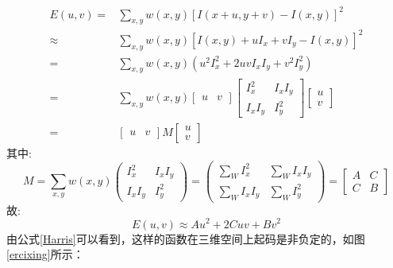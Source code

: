\begin{equation}
\begin{aligned}
E(u,v)=&\sum_{x,y} w(x,y) [I(x+u, y+v)-I(x, y)]^{2} \\
\approx&\sum_{x,y}w(x,y)\left[I(x, y)+u I_{x}+v I_{y}-I(x, y)\right]^{2}\\
=&\sum_{x,y}w(x,y) \left(u^{2} I_{x}^{2}+2 u v I_{x} I_{y}+v^{2} I_{y}^{2} \right)\\
=&\sum_{x,y}w(x,y) \left[ \begin{array}{cc}{u} & {v}\end{array}\right] \left[ \begin{array}{cc}{I_{x}^{2}} & {I_{x} I_{y}} \\ 
{I_{x} I_{y}} & {I_{y}^{2}}\end{array}\right] \left[ \begin{array}{c}{u} \\ 
{v}\end{array}\right]\\
=&\left[ \begin{array}{cc}{u} & {v}\end{array}\right]M\left[\begin{array}{c}{u}\\{v}\end{array}\right]
\end{aligned}
\end{equation}
其中:
\begin{equation}
M=\sum_{x, y} w(x, y) \left( \begin{array}{cc}{I_{x}^{2}} & {I_{x} I_{y}} \\ {I_{x} I_{y}} & {I_{y}^{2}}\end{array}\right)=\left( \begin{array}{cc}{\sum_{W} I_{x}^{2}} & {\sum_{W} I_{x} I_{y}} \\ {\sum_{W} I_{x} I_{y}} & {\sum_{W} I_{y}^{2}}\end{array}\right)=\left[ \begin{array}{cc}{A} & {C} \\ {C} & {B}\end{array}\right]
\end{equation}
故:
\begin{equation}
	E(u,v) \approx Au^{2}+2Cuv+Bv^{2}
\end{equation}
由公式\ref{Harris}可以看到，这样的函数在三维空间上起码是非负定的，如图\ref{ercixing}所示：
